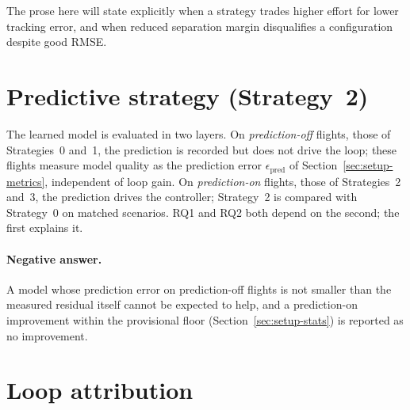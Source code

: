 The prose here will state explicitly when a strategy trades higher effort for lower tracking error,
and when reduced separation margin disqualifies a configuration despite good RMSE.

\section{Predictive strategy (Strategy~2)}
\label{sec:res2-nn}

The learned model is evaluated in two layers. On \emph{prediction-off} flights, those of
Strategies~0 and~1, the prediction is recorded but does not drive the loop; these flights measure
model quality as the prediction error $\epsilon_{\mathrm{pred}}$ of Section~\ref{sec:setup-metrics},
independent of loop gain. On \emph{prediction-on} flights, those of Strategies~2 and~3, the
prediction drives the controller; Strategy~2 is compared with Strategy~0 on matched scenarios. RQ1
and RQ2 both depend on the second; the first explains it.



\paragraph{Negative answer.} A model whose prediction error on prediction-off flights is not smaller
than the measured residual itself cannot be expected to help, and a prediction-on improvement
within the provisional floor (Section~\ref{sec:setup-stats}) is reported as no improvement.

\section{Loop attribution}
\label{sec:res2-attribution}

